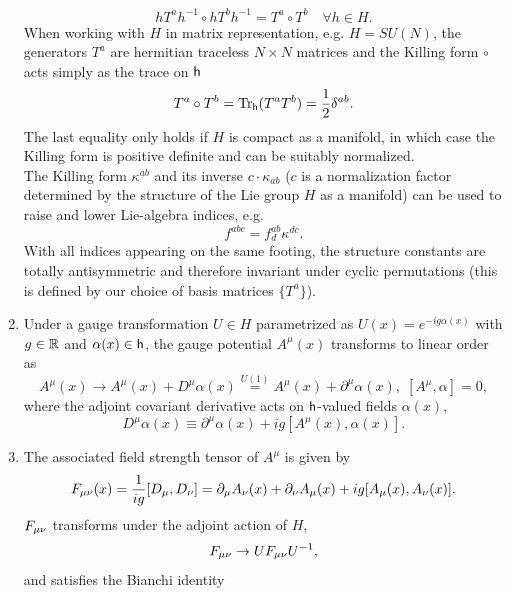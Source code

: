 \begin{enumerate}
\begin{equation}
	h T^a h^{-1} \circ h T^b h^{-1} = T^a \circ T^b \quad \forall h \in H.
\end{equation}
When working with $H$ in matrix representation, e.g. $H=SU(N)$, the generators $T^a$ are hermitian traceless $N\times N$ matrices and the Killing form $\circ$ acts  simply as the trace on $\mathsf{h}$
\begin{equation}
	T^a \circ T^b = \mathrm{Tr}_{\mathsf{h}} (T^a T^b) = \frac{1}{2} \delta^{ab}.
\end{equation}
The last equality only holds if $H$ is compact as a manifold, in which case the Killing form is positive definite and can be suitably normalized.\\
The Killing form $\kappa^{ab}$ and its inverse $c\cdot \kappa_{ab}$ ($c$ is a normalization factor determined by the structure of the Lie group $H$ as a manifold) can be used to raise and lower Lie-algebra indices, e.g.
\begin{equation}
	f^{abc} = f^{ab}_d \kappa^{dc}.
\end{equation}
With all indices appearing on the same footing, the structure constants are totally antisymmetric and therefore invariant under cyclic permutations (this is defined by our choice of basis matrices $\{T^a\}$).
\item Under a gauge transformation $U\in H$ parametrized as $U(x) = e^{-i g \alpha(x)}$ with $g\in \mathbb{R}$ and $\alpha(x) \in \mathsf{h}$, the gauge potential $A^\mu(x)$ transforms to linear order as
\begin{equation}
	A^\mu(x) \rightarrow A^\mu(x) + D^\mu \alpha(x) \stackrel{U(1)}{=}  A^\mu(x) + \partial^\mu \alpha(x), \; [A^\mu,\alpha] = 0,
\end{equation}
where the adjoint covariant derivative acts on $\mathsf{h}$-valued fields $\alpha(x)$,
\begin{equation}
	D^\mu\alpha(x) \equiv \partial^\mu \alpha(x) + ig [A^\mu(x) , \alpha(x)].	
\end{equation}
\item The associated field strength tensor of $A^\mu$ is given by
\begin{equation}
	F_{\mu \nu}(x) = \frac{1}{ig} [D_\mu,D_\nu] = \partial_\mu A_\nu(x) + \partial_\nu A_\mu(x) + ig [A_\mu(x), A_\nu(x)].
\end{equation}
$F_{\mu \nu}$ transforms under the adjoint action of $H$, 
\begin{equation}
	F_{\mu \nu} \rightarrow U F_{\mu \nu} U^{-1},
\end{equation}
and satisfies the Bianchi identity 
\begin{equation}

\end{equation}
\end{enumerate}
